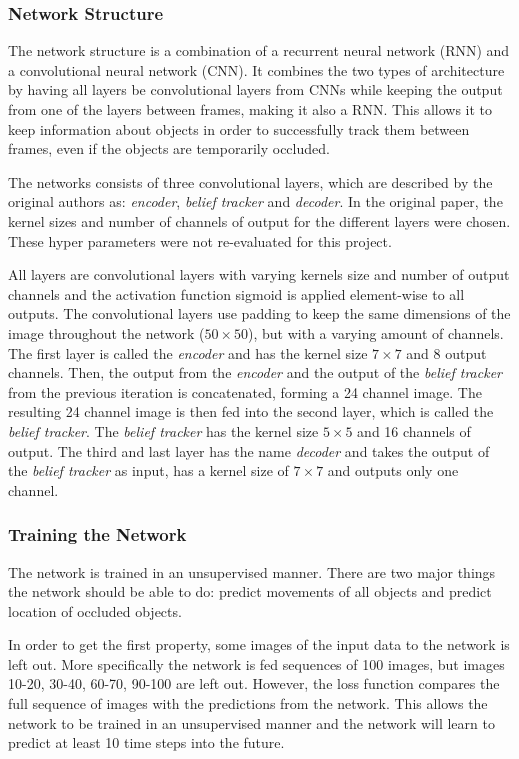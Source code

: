 \documentclass[a4paper]{article}
\begin{document}
\subsubsection{Network Structure}

The network structure is a combination of a recurrent neural network (RNN) and a convolutional neural network (CNN).
It combines the two types of architecture by having all layers be convolutional layers from CNNs while keeping the output from one of the layers between frames, making it also a RNN.
This allows it to keep information about objects in order to successfully track them between frames, even if the objects are temporarily occluded.

The networks consists of three convolutional layers, which are described by the original authors as: \emph{encoder}, \emph{belief tracker} and \emph{decoder}.
In the original paper, the kernel sizes and number of channels of output for the different layers were chosen.
These hyper parameters were not re-evaluated for this project.

All layers are convolutional layers with varying kernels size and number of output channels and the activation function sigmoid is applied element-wise to all outputs.
The convolutional layers use padding to keep the same dimensions of the image throughout the network ($50 \times 50$), but with a varying amount of channels.
The first layer is called the \emph{encoder} and has the kernel size $7 \times 7$ and 8 output channels.
Then, the output from the \emph{encoder} and the output of the \emph{belief tracker} from the previous iteration is concatenated, forming a 24 channel image.
The resulting 24 channel image is then fed into the second layer, which is called the \emph{belief tracker}.
The \emph{belief tracker} has the kernel size $5 \times 5$ and 16 channels of output.
The third and last layer has the name \emph{decoder} and takes the output of the \emph{belief tracker} as input, has a kernel size of $7 \times 7$ and outputs only one channel.

\subsubsection{Training the Network}

The network is trained in an unsupervised manner.
There are two major things the network should be able to do: predict movements of all objects and predict location of occluded objects.

In order to get the first property, some images of the input data to the network is left out.
More specifically the network is fed sequences of 100 images, but images 10-20, 30-40, 60-70, 90-100 are left out.
However, the loss function compares the full sequence of images with the predictions from the network.
This allows the network to be trained in an unsupervised manner and the network will learn to predict at least 10 time steps into the future.
\end{document}
